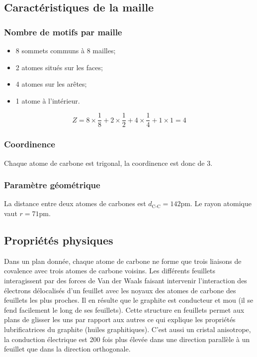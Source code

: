 \subsection{Caractéristiques de la maille}
\subsubsection{Nombre de motifs par maille}
\begin{itemize}
    \item 8 sommets communs à 8 mailles;
    \item 2 atomes situés sur les faces;
    \item 4 atomes sur les arêtes;
    \item 1 atome à l'intérieur.
\end{itemize}
\begin{equation}
    Z = 8 \times \frac{1}{8} + 2 \times \frac{1}{2} + 4 \times
    \frac{1}{4} + 1 \times 1 = 4
\end{equation}
\subsubsection{Coordinence}
Chaque atome de carbone est trigonal, la coordinence
est donc de 3.
\subsubsection{Paramètre géométrique}
La distance entre deux atomes de carbones est $d_\text{C-C} = 142$pm.
Le rayon atomique vaut $r = 71$pm.

\subsection{Propriétés physiques}
Dans un plan donnée, chaque atome de carbone ne forme que trois
liaisons de covalence avec trois atomes de carbone voisins.
Les différents feuillets interagissent par des forces de Van der
Waals faisant intervenir l'interaction des électrons délocalisés
d'un feuillet avec les noyaux des atomes de carbone des feuillets
les plus proches.
Il en résulte que le graphite est conducteur et mou (il se fend
facilement le long de ses feuillets).
Cette structure en feuillets permet aux plans de glisser les uns
par rapport aux autres ce qui explique les propriétés lubrificatrices
du graphite (huiles graphitiques). C'est aussi un cristal anisotrope,
la conduction électrique est 200 fois plus élevée dans une direction
parallèle à un feuillet que dans la direction orthogonale.


